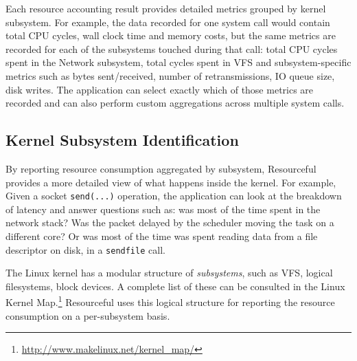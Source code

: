 \documentclass[letterpaper,twocolumn,10pt]{article}
\newcommand{\pname}{Resourceful}
\newcommand{\lnote}[1]{\textcolor{red}{[\textit{#1}]}} %
\begin{document}
Each resource accounting result provides detailed metrics grouped by kernel
subsystem. For example, the data recorded for one system call would contain
total CPU cycles, wall clock time and memory costs, but the same
metrics are recorded for each of the subsystems touched during that call: total
CPU cycles spent in the Network subsystem, total cycles spent in VFS and
subsystem-specific metrics such as bytes sent/received, number of
retransmissions, IO queue size, disk writes. The application can select exactly
which of those metrics are recorded and can also perform custom aggregations
across multiple system calls.

\subsection{Kernel Subsystem Identification}
By reporting resource consumption aggregated by subsystem, Resourceful provides
a more detailed view of what happens inside the kernel. For example,  Given a
socket \texttt{send(...)} operation, the application can look at the breakdown
of latency and answer questions such as: was most of the time spent in the
network stack? Was the packet delayed by the scheduler moving the task on a
different core? Or was most of the time was spent reading data from a file
descriptor on disk, in a \texttt{sendfile} call.
 
The Linux kernel has a modular structure of \emph{subsystems}, such as VFS,
logical filesystems, block devices. A complete list of these can be consulted in
the Linux Kernel Map.\footnote{\url{http://www.makelinux.net/kernel_map/}}
\pname{ }uses this logical structure for reporting the resource consumption on a
per-subsystem basis. 


\end{document}
